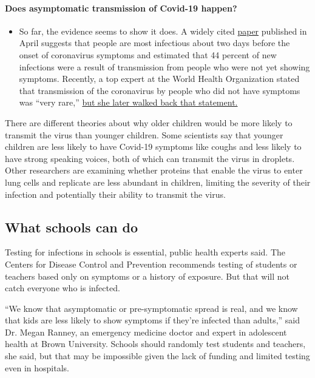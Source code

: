\begin{itemize}
{  \paragraph{Does asymptomatic transmission of Covid-19
  happen?}\label{does-asymptomatic-transmission-of-covid-19-happen}}

  \begin{itemize}
  \tightlist
  \item
    So far, the evidence seems to show it does. A widely cited
    \href{https://www.nature.com/articles/s41591-020-0869-5}{paper}
    published in April suggests that people are most infectious about
    two days before the onset of coronavirus symptoms and estimated that
    44 percent of new infections were a result of transmission from
    people who were not yet showing symptoms. Recently, a top expert at
    the World Health Organization stated that transmission of the
    coronavirus by people who did not have symptoms was ``very rare,''
    \href{https://www.nytimes.com/2020/06/09/world/coronavirus-updates.html?action=click\&pgtype=Article\&state=default\&region=MAIN_CONTENT_3\&context=storylines_faq\#link-1f302e21}{but
    she later walked back that statement.}
  \end{itemize}
\end{itemize}

There are different theories about why older children would be more
likely to transmit the virus than younger children. Some scientists say
that younger children are less likely to have Covid-19 symptoms like
coughs and less likely to have strong speaking voices, both of which can
transmit the virus in droplets. Other researchers are examining whether
proteins that enable the virus to enter lung cells and replicate are
less abundant in children, limiting the severity of their infection and
potentially their ability to transmit the virus.

\hypertarget{what-schools-can-do}{%
\subsection{What schools can do}\label{what-schools-can-do}}

Testing for infections in schools is essential, public health experts
said. The Centers for Disease Control and Prevention recommends testing
of students or teachers based only on symptoms or a history of exposure.
But that will not catch everyone who is infected.

``We know that asymptomatic or pre-symptomatic spread is real, and we
know that kids are less likely to show symptoms if they're infected than
adults,'' said Dr. Megan Ranney, an emergency medicine doctor and expert
in adolescent health at Brown University. Schools should randomly test
students and teachers, she said, but that may be impossible given the
lack of funding and limited testing even in hospitals.

